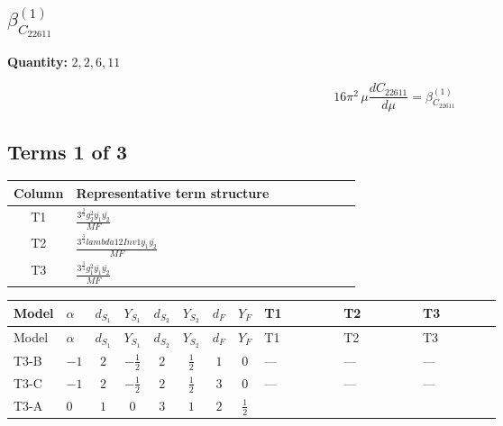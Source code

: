 \documentclass[8pt]{article}
\begin{document}
\begin{landscape}
\section*{$\beta_{C_{22611}}^{(1)}$}
\noindent\textbf{Quantity: }$\mathrm{2,2,6,11}$\par\smallskip
\[16\pi^2\,\mu\frac{d C_{22611}}{d\mu}=\beta_{C_{22611}}^{(1)}\]
\subsection*{Terms 1 of 3}
\begin{center}
\begin{tabular}{@{}c >{\raggedright\arraybackslash}p{0.82\linewidth}@{}}
\toprule
Column & Representative term structure \\
\midrule
T1 & \(\displaystyle \frac{3^{\frac{3}{4}} g_{2}^{2} \overline{y_{1}} \overline{y_{2}}}{MF}\) \\
\midrule
T2 & \(\displaystyle \frac{3^{\frac{3}{4}} lambda12Inv1 \overline{y_{1}} \overline{y_{2}}}{MF}\) \\
\midrule
T3 & \(\displaystyle \frac{3^{\frac{3}{4}} g_{1}^{2} \overline{y_{1}} \overline{y_{2}}}{MF}\) \\
\midrule
\bottomrule
\end{tabular}
\end{center}
\smallskip
\tiny
\begin{longtable}{@{}llcccccc >{\raggedright\arraybackslash}p{0.21\linewidth} >{\raggedright\arraybackslash}p{0.21\linewidth} >{\raggedright\arraybackslash}p{0.21\linewidth}@{}}
\toprule
Model & $\alpha$ & $d_{S_1}$ & $Y_{S_1}$ & $d_{S_2}$ & $Y_{S_2}$ & $d_F$ & $Y_F$ & T1 & T2 & T3 \\
\midrule
\endfirsthead
\toprule
Model & $\alpha$ & $d_{S_1}$ & $Y_{S_1}$ & $d_{S_2}$ & $Y_{S_2}$ & $d_F$ & $Y_F$ & T1 & T2 & T3 \\
\midrule
\endhead
T3-B & $-1$ & $2$ & $-\frac{1}{2}$ & $2$ & $\frac{1}{2}$ & $1$ & $0$ & --- & --- & --- \\
\midrule
T3-C & $-1$ & $2$ & $-\frac{1}{2}$ & $2$ & $\frac{1}{2}$ & $3$ & $0$ & --- & --- & --- \\
\midrule
T3-A & $0$ & $1$ & $0$ & $3$ & $1$ & $2$ & $\frac{1}{2}$ & \scriptsize\adjustbox{max width=\linewidth}{$\begin{gathered} - \frac{11 \cdot 3^{\frac{3}{4}} g_{2}^{2} \overline{y_{1}} \overline{y_{2}}}{8 MF}\end{gathered}$} & \scriptsize\adjustbox{max width=\linewidth}{$\begin{gathered} - \frac{3^{\frac{3}{4}} lambda12Inv1 \overline{y_{1}} \overline{y_{2}}}{6 MF}\end{gathered}$} & \scriptsize\adjustbox{max width=\linewidth}{$\begin{gathered} - \frac{3^{\frac{3}{4}} g_{1}^{2} \overline{y_{1}} \overline{y_{2}}}{8 MF}\end{gathered}$} \\

\end{longtable}
\end{landscape}
\end{document}
